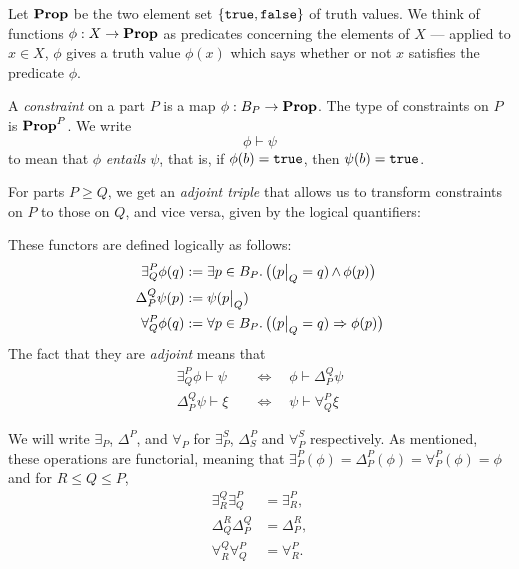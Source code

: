 Let $\operatorname{\textbf{Prop}}$ be the two element set $\{\mathtt{true},\mathtt{false}\}$ of truth values. We think
of functions $\phi : X \to \operatorname{\textbf{Prop}}$ as predicates concerning the elements of $X$
--- applied to $x \in X$, $\phi$ gives a truth value $\phi(x)$ which says
whether or not $x$ satisfies the predicate $\phi$. 
\begin{defn}
A \emph{constraint} on a part $P$ is a map $\phi : B_P \to \operatorname{\textbf{Prop}}$. The type of constraints on $P$ is $\operatorname{\textbf{Prop}}^P$. We write
$$\phi \vdash \psi$$
to mean that $\phi$ \emph{entails} $\psi$, that is, if $\phi(b) = \mathtt{true}$, then $\psi(b) = \mathtt{true}$.
\end{defn}

For parts $P\geq Q$, we get an \emph{adjoint triple} that allows us to transform
constraints on $P$ to those on $Q$, and vice versa, given by the logical quantifiers:
    \begin{center}
    \end{center}
These functors are defined logically as follows:
\begin{align*}
    \exists^P_Q \phi(q) &:= \exists p \in B_P.\, \big((p\big|_{Q} = q) \operatorname{\wedge} \phi(p)\big) \\
    \Delta^Q_P \psi(p) &:= \psi(p\big|_{Q}) \\
    \forall^P_Q \phi(q) &:= \forall p \in B_P.\, \big((p\big|_{Q} = q) \Rightarrow \phi(p)\big)
\end{align*}
The fact that they are \emph{adjoint} means that
\begin{align*}
    \exists^P_Q \phi \vdash \psi\quad &\iff \quad\phi \vdash \Delta^Q_P \psi \\
    \Delta^Q_P \psi \vdash \xi\quad &\iff\quad \psi \vdash \forall^P_Q \xi 
\end{align*}

We will write $\exists_P$, $\Delta^P$, and $\forall_P$ for $\exists^S_P$, $\Delta^P_S$ and $\forall^S_P$ respectively. As mentioned, these operations are functorial, meaning that $\exists^P_P(\phi)=\Delta^P_P(\phi)=\forall^P_P(\phi)=\phi$ and for $R \leq Q \leq P$,
\begin{align*}
    \exists^Q_R  \exists^P_Q &= \exists^P_R, \\
    \Delta^R_Q \Delta^Q_P &= \Delta^R_P, \\
    \forall^Q_R \forall^P_Q  &= \forall^P_R.
\end{align*}

